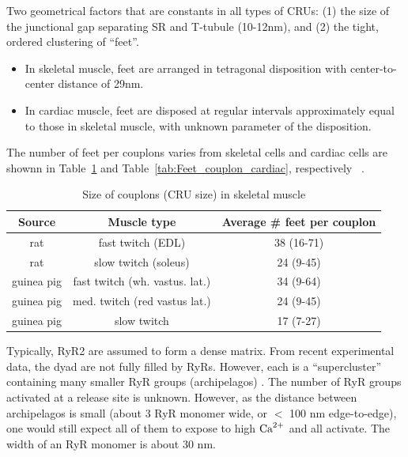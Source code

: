  \begin{framed}
    
    Two geometrical factors that are constants in all types of CRUs: (1)
    the size of the junctional gap separating SR and T-tubule (10-12nm),
    and (2) the tight, ordered clustering of ``feet''.
    \begin{itemize}
    \item In skeletal muscle, feet are arranged in tetragonal
      disposition with center-to-center distance of 29nm.
    \item In cardiac muscle, feet are disposed at regular intervals
      approximately equal to those in skeletal muscle, with unknown
      parameter of the disposition.
    \end{itemize}
    The number of feet per couplons varies from skeletal cells and cardiac
    cells are shownn in Table~\ref{tab:Feet_couplon_skeletal} and
    Table~\ref{tab:Feet_couplon_cardiac},
    respectively ~\citep{franzini_armstrong1999ssd}.
  \end{framed}

 \begin{table}[hbt]
    \begin{center}
      \caption{Size of couplons (CRU size) in skeletal muscle}
      \begin{tabular}{ccc} 
        \hline
        Source & Muscle type & Average \# feet per couplon \\ 
        \hline\hline
        rat & fast twitch (EDL) & 38 (16-71) \\
        rat & slow twitch (soleus) & 24 (9-45) \\
        guinea pig & fast twitch (wh. vastus. lat.) & 34 (9-64) \\
        guinea pig & med. twitch (red vastus lat.) & 24 (9-45) \\
        guinea pig & slow twitch & 17 (7-27) 
      \end{tabular}
    \end{center}
    \label{tab:Feet_couplon_skeletal}
  \end{table}

Typically, RyR2 are assumed to form a dense matrix. From recent experimental
data, the dyad are not fully filled by RyRs. However, each is a ``supercluster''
containing many smaller RyR groups (archipelagos)
\citep{Baddeley2009,hayashi2009}. The number of RyR groups activated at a
release site is unknown. However, as the distance between archipelagos is small
(about 3 RyR monomer wide, or $<$ 100 nm edge-to-edge), one would still expect
all of them to expose to high ${\text{Ca}^{2+}}$ and all activate. The width of an RyR
monomer is about 30 nm.

